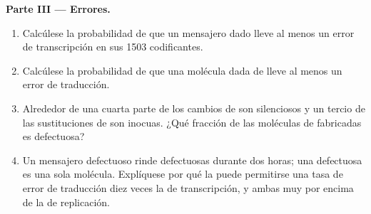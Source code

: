 \begin{problem}
\medskip
\noindent\textbf{Parte III --- Errores.}
\begin{enumerate}[resume]
  \item Calcúlese la probabilidad de que un mensajero dado lleve al menos
        un error de transcripción en sus \qty{1503}{} 
        codificantes.
  \item Calcúlese la probabilidad de que una molécula dada de 
        lleve al menos un error de traducción.
  \item Alrededor de una cuarta parte de los cambios de  son
        silenciosos y un tercio de las sustituciones de  son
        inocuas. ¿Qué fracción de las moléculas de  fabricadas es
        defectuosa?
  \item Un mensajero defectuoso rinde  defectuosas durante dos
        horas; una  defectuosa es una sola molécula. Explíquese por
        qué la  puede permitirse una tasa de error de traducción diez
        veces la de transcripción, y ambas muy por encima de la de
        replicación.
\end{enumerate}


\end{problem}
